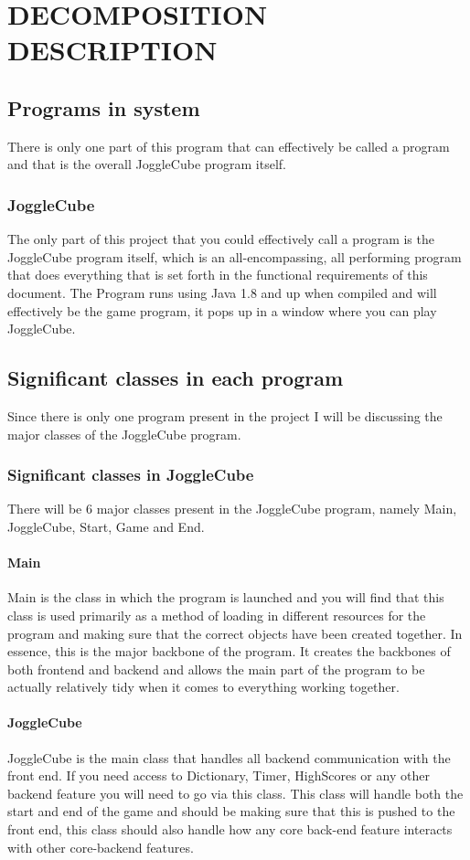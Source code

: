 \section{DECOMPOSITION DESCRIPTION}
	\subsection{Programs in system}
    There is only one part of this program that can effectively be called a program and that is the overall JoggleCube program itself.
    	\subsubsection{JoggleCube}
        The only part of this project that you could effectively call a program is the JoggleCube program itself, which is an all-encompassing, all performing program that does everything that is set forth in the functional requirements of this document. The Program runs using Java 1.8 and up when compiled and will effectively be the game program, it pops up in a window where you can play JoggleCube.
	\subsection{Significant classes in each program}
    Since there is only one program present in the project I will be discussing the major classes of the JoggleCube program.
		\subsubsection{Significant classes in JoggleCube}
        There will be 6 major classes present in the JoggleCube program, namely Main, JoggleCube, Start, Game and End.
        	\paragraph{Main}
            Main is the class in which the program is launched and you will find that this class is used primarily as a method of loading in different resources for the program and making sure that the correct objects have been created together. In essence, this is the major backbone of the program. It creates the backbones of both frontend and backend and allows the main part of the program to be actually relatively tidy when it comes to everything working together.
            \paragraph{JoggleCube}
            JoggleCube is the main class that handles all backend communication with the front end. If you need access to Dictionary, Timer, HighScores or any other backend feature you will need to go via this class. This class will handle both the start and end of the game and should be making sure that this is pushed to the front end, this class should also handle how any core back-end feature interacts with other core-backend features.
